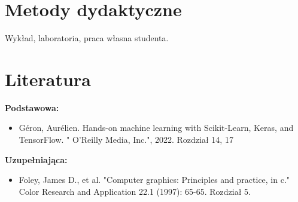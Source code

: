 \documentclass[12pt, a4paper]{article}
\begin{document}
\section{Metody dydaktyczne}

Wykład, laboratoria, praca własna studenta.

\section{Literatura}

\textbf{Podstawowa:}
\begin{itemize}
  \item Géron, Aurélien. Hands-on machine learning with Scikit-Learn, Keras, and TensorFlow. " O'Reilly Media, Inc.", 2022.  Rozdział 14, 17
\end{itemize}

\textbf{Uzupełniająca:}
\begin{itemize}
  \item Foley, James D., et al. "Computer graphics: Principles and practice, in c." Color Research and Application 22.1 (1997): 65-65. Rozdział 5.
\end{itemize}
\end{document}
